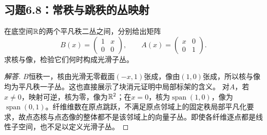 \subsection*{习题6.8：常秩与跳秩的丛映射}
在底空间$\mathbb{R}$的两个平凡秩二丛之间，分别给出矩阵
\[
 B(x)=\begin{pmatrix}1&x\\0&0\end{pmatrix},\qquad
 A(x)=\begin{pmatrix}x&0\\0&1\end{pmatrix}.
\]
求核与像，检验它们何时构成光滑子丛。
\begin{proof}[解答]
$B$恒秩一，核由光滑无零截面$(-x,1)$张成，像由$(1,0)$张成，所以核与像均为平凡秩一子丛。这也直接展示了块消元证明中局部标架的含义。
对$A$，若$x\ne0$，映射可逆，核为零，像为$\mathbb{R}^2$；在$x=0$，核为$\operatorname{span}(1,0)$，像为$\operatorname{span}(0,1)$。纤维维数在原点跳跃，不满足原点邻域上的固定秩局部平凡化要求，故点态核与点态像的整体都不是该邻域上的向量子丛。即使各纤维逐点都是线性子空间，也不足以定义光滑子丛。
\end{proof}
